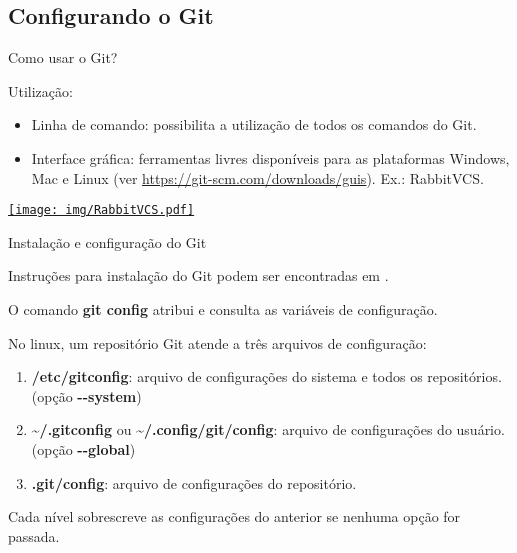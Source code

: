 \documentclass[a4paper]{beamer}
\begin{document}
\subsection{Configurando o Git}

\begin{frame}{Como usar o Git?}

Utilização:
\begin{itemize}
\item Linha de comando: possibilita a utilização de todos os comandos do Git.
\item Interface gráfica: ferramentas livres disponíveis para as plataformas Windows, Mac e Linux (ver \url{https://git-scm.com/downloads/guis}). Ex.: RabbitVCS.
\end{itemize}

\begin{center}
\href{http://rabbitvcs.org/}{\texttt{[image: img/RabbitVCS.pdf]}}
\end{center}

\end{frame}

\begin{frame}{Instalação e configuração do Git}

Instruções para instalação do Git podem ser encontradas em \cite{proGit}.
\pause

\vspace{10pt}
O comando \textbf{git config} atribui e consulta as variáveis de configuração.

\vspace{10pt}
No linux, um repositório Git atende a três arquivos de configuração:
\begin{enumerate}[<+->]
\item \textbf{/etc/gitconfig}: arquivo de configurações do sistema e todos os repositórios. (opção \textbf{-{}-system})
\item \textbf{\textasciitilde /.gitconfig} ou \textbf{\textasciitilde /.config/git/config}: arquivo de configurações do usuário. (opção \textbf{-{}-global})
\item \textbf{.git/config}: arquivo de configurações do repositório.
\end{enumerate}

\vspace{10pt}
Cada nível sobrescreve as configurações do anterior se nenhuma opção for passada.

\end{frame}
\end{document}
